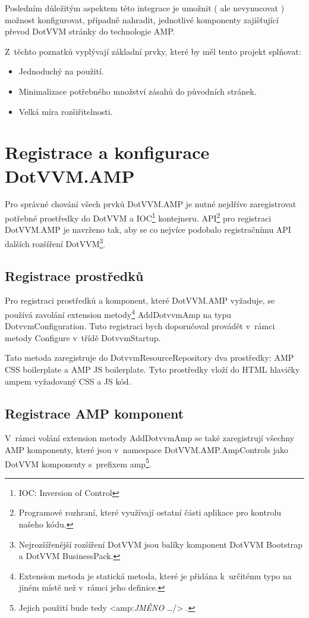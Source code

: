 Posledním důležitým aspektem této integrace je umožnit ( ale nevynucovat ) možnost konfigurovat, případně nahradit, jednotlivé komponenty zajišťující převod DotVVM stránky do technologie AMP.

Z~těchto poznatků vyplývají základní prvky, které by měl tento projekt splňovat:
\begin{itemize}
\item Jednoduchý na použití.
\item Minimalizace potřebného množství zásahů do původních stránek.
\item Velká míra rozšiřitelnosti.
\end{itemize}

\section{Registrace a konfigurace DotVVM.AMP}
Pro správné chování všech prvků DotVVM.AMP je nutné nejdříve zaregistrovat potřebné prostředky do DotVVM a IOC\footnote{IOC: Inversion of Control} kontejneru. API\footnote{Programové rozhraní, které využívají ostatní části aplikace pro kontrolu našeho kódu.} pro registraci DotVVM.AMP je navrženo tak, aby se co nejvíce podobalo registračnímu API dalších rozšíření DotVVM\footnote{Nejrozšířenější rozšíření DotVVM jsou balíky komponent DotVVM Bootstrap a DotVVM BusinessPack.}.

\subsection*{Registrace prostředků}
Pro registraci prostředků a komponent, které DotVVM.AMP vyžaduje, se používá zavolání extension metody\footnote{\label{extension}Extension metoda je statická metoda, které je přidána k~určitému typo na jiném místě než v~rámci jeho definice.} AddDotvvmAmp na typu DotvvmConfiguration. Tuto registraci bych doporučoval provádět v~rámci metody Configure v~třídě DotvvmStartup.

Tato metoda zaregistruje do DotvvmResourceRepository dva prostředky: AMP CSS boilerplate a AMP JS boilerplate. Tyto prostředky vloží do HTML hlavičky ampem vyžadovaný CSS a JS kód.

\subsection*{Registrace AMP komponent}
V~rámci volání extension metody AddDotvvmAmp se také zaregistrují všechny AMP komponenty, které jsou v~namespace DotVVM.AMP.AmpControls jako DotVVM komponenty s~prefixem amp\footnote{Jejich použití bude tedy <amp:\textit{JMÉNO} \ldots /> . }.

